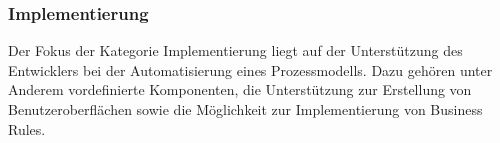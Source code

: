 \subsubsection*{Implementierung}
Der Fokus der Kategorie Implementierung liegt auf der Unterstützung des Entwicklers bei der Automatisierung eines Prozessmodells. Dazu gehören unter Anderem vordefinierte Komponenten, die Unterstützung zur Erstellung von Benutzeroberflächen sowie die Möglichkeit zur Implementierung von Business Rules.
\newpage
\small  %
\setlength\LTleft{0pt}            %
\setlength\LTright{0pt}           %
\label{kriterienImplementierung}
